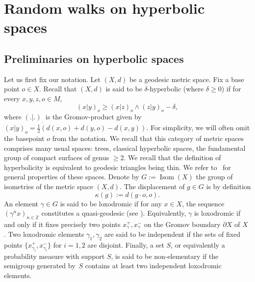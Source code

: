 \documentclass[JEP,XML,SOM,Unicode,published]{cedram}
\theoremstyle{plain}
\theoremstyle{definition}
\newcommand\Z{\mathbb{Z}}
\DeclareMathOperator\Isom{Isom}
\begin{document}
\section{Random walks on hyperbolic spaces}\label{sec.hyperbolic}

\subsection{Preliminaries on hyperbolic spaces}\label{subsec.hyperbolic}
Let us first fix our notation.
Let $(X,d)$ be a geodesic metric space. Fix a base point $o\in X$. Recall that $(X,d)$ is said to be $\delta$-hyperbolic (where $\delta\geq 0$) if
for every $x,y,z,o \in M$,
\begin{equation}\label{eq.defining.eq}
(x|y)_o \geq (x|z)_o \wedge (z|y)_o -\delta,
\end{equation}
where $(.|.)_.$ is the Gromov-product given by $(x|y)_o=\frac{1}{2}(d(x,o)+d(y,o)-d(x,y))$. For simplicity, we will often omit the basepoint $o$ from the notation.
We recall that this category of metric spaces comprises many usual spaces: trees, classical hyperbolic spaces, the fundamental group of compact surfaces of genus $\geq 2$. We recall that the definition of hyperbolicity is equivalent to geodesic triangles being thin. We refer to~\cite{hyperbolic-book} for general properties of these spaces. Denote by $G:=\Isom(X)$ the group of isometries of the metric space $(X,d)$. The displacement of $g\in G$ is by definition
\[
\kappa(g):=d(g\cdot o, o).
\]
An element $\gamma \in G$ is said to be loxodromic if for any $x \in X$, the sequence $(\gamma^nx)_{n \in \Z}$ constitutes a quasi-geodesic (see \cite[Ch.\,3]{hyperbolic-book}). Equivalently, $\gamma$ is loxodromic if and only if it fixes precisely two points $x_\gamma^+,x_\gamma^-$ on the Gromov boundary $\partial X$ of $X$ \cite[Ch.\,9 \& 10]{hyperbolic-book}. Two loxodromic elements $\gamma_1,\gamma_2$ are said to be independent if the sets of fixed points $\{x^+_{\gamma_i} ,x^-_{\gamma_i}\}$ for $i=1,2$ are disjoint. Finally, a set $S$, or equivalently a probability measure with support $S$, is said to be non-elementary if the semigroup generated by~$S$ contains at least two independent loxodromic elements.
\end{document}

